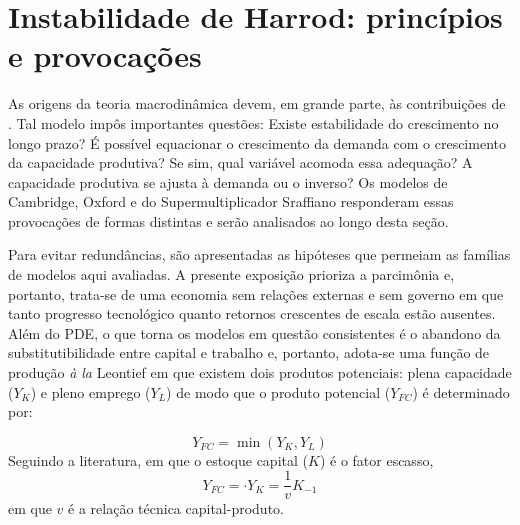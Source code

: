 
\section{Instabilidade de Harrod: princípios e provocações}\label{SecHarrod}


As origens da teoria macrodinâmica devem, em grande parte, às contribuições de \textcite{harrod_essay_1939}. Tal modelo impôs importantes questões: Existe estabilidade do crescimento no longo pra\-zo? É possível equacionar o crescimento da demanda com o crescimento da capacidade produtiva? Se sim, qual variável acomoda essa adequação? A capacidade produtiva se ajusta à demanda ou o inverso? Os modelos de Cambridge, Oxford e do Supermultiplicador Sraffiano responderam essas provocações de formas distintas e serão analisados ao longo desta seção.


Para evitar redundâncias, são apresentadas as hipóteses que permeiam as famílias de modelos aqui avaliadas. 
A presente exposição prioriza a parcimônia e, portanto, trata-se de uma economia sem relações externas e sem governo em que tanto progresso tecnológico quanto retornos crescentes de escala estão ausentes. Além do PDE, o que torna os modelos em questão consistentes
é o abandono da substitutibilidade entre capital e trabalho e, portanto, adota-se uma função de produção
\textit{à la} Leontief em que existem dois produtos potenciais: plena capacidade ($Y_K$) e pleno emprego ($Y_L$) de modo que o produto potencial ($Y_{FC}$) é determinado por:

\begin{equation}
    Y_{FC} = \min (Y_K, Y_L)
\end{equation}
Seguindo a literatura, em que o estoque capital ($K$) é o fator escasso,
\begin{equation}
\label{Oferta}
    Y_{FC} = \cdot Y_K = \frac{1}{v}K_{-1}
\end{equation}
em que $v$ é a relação técnica capital-produto. 


